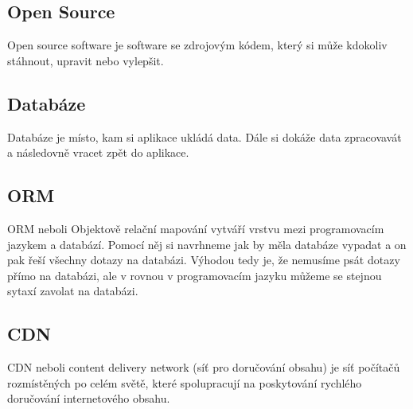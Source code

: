 \subsection{Open Source}
Open source software je software se zdrojovým kódem, který si může kdokoliv stáhnout, upravit nebo vylepšit. \cite{OpenSource}

\subsection{Databáze}
Databáze je místo, kam si aplikace ukládá data. Dále si dokáže data zpracovavát a následovně vracet zpět do aplikace.

\subsection{ORM}
ORM neboli Objektově relační mapování vytváří vrstvu mezi programovacím jazykem a databází. Pomocí něj si navrhneme jak by měla databáze vypadat a on pak řeší všechny dotazy na databázi. Výhodou tedy je, že nemusíme psát dotazy přímo na databázi, ale v rovnou v programovacím jazyku můžeme se stejnou sytaxí zavolat na databázi.

\subsection{CDN}
CDN neboli content delivery network (síť pro doručování obsahu) je síť počítačů rozmístěných po celém světě, které spolupracují na poskytování rychlého doručování internetového obsahu.\cite{CDN}
